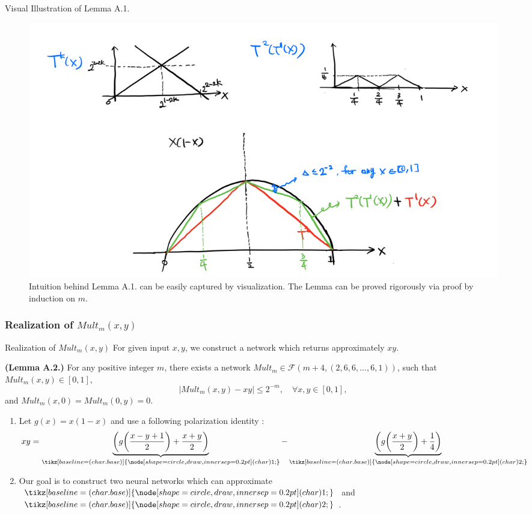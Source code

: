 \documentclass{if-beamer}
\newcommand*\circled[1]{\tikz[baseline=(char.base)]{
            \node[shape=circle,draw,inner sep=0.2pt] (char) {#1};}}
\begin{document}
\begin{frame}{Visual Illustration of Lemma A.1. }

    \begin{figure}[htbp]
        \includegraphics[width=1\textwidth]{approx.png}
        \caption{ Intuition behind Lemma A.1. can be easily captured by visualization. The Lemma can be proved rigorously via proof by induction on $m$. }
        \label{fig:figure2}
    \end{figure}

\end{frame}

\subsubsection{Realization of $Mult_{m}(x,y)$}
\begin{frame}{Realization of $Mult_{m}(x,y)$}
    For given input $x,y$, we construct a network which returns 
    approximately $xy$.
    
    \begin{tcolorbox}
    \textbf{(Lemma A.2.)}
    For any positive integer $m$, there exists a network $Mult_m \in \mathcal{F}(m+4,(2,6,6,\dots,6,1))$, such that $Mult_m(x,y)\in[0,1]$,
    \begin{equation*}
        \left|Mult_m(x,y)-xy\right|\leq 2^{-m}, \quad \forall x, y \in [0,1],
    \end{equation*}
    and $Mult_m(x,0)=Mult_m(0,y)=0$.
    \end{tcolorbox}
    \begin{enumerate}
        \item Let $g(x)=x(1-x)$ and use a following polarization identity : 
        \begin{equation*}
            xy = \underbrace{\bigg( g\bigg( \frac{x-y+1}{2} \bigg) + \frac{x+y}{2} \bigg)}_{\circled{1}} - \underbrace{\bigg( g\bigg( \frac{x+y}{2} \bigg) + \frac{1}{4} \bigg)}_{\circled{2}}
        \end{equation*}
        \item Our goal is to construct two neural networks which can approximate $\circled{1}$ and $\circled{2}$. 
    \end{enumerate}

\end{frame}
\end{document}
